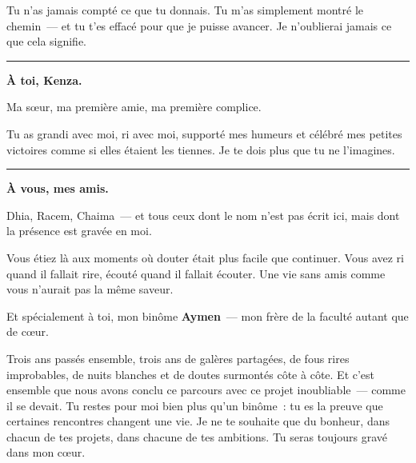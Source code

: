 \begin{center}
\begin{minipage}{0.75\textwidth}
\vspace{0.3cm}

Tu n'as jamais compté ce que tu donnais. Tu m'as simplement montré le chemin~---
et tu t'es effacé pour que je puisse avancer. Je n'oublierai jamais ce que cela signifie.
\end{minipage}

\vspace{1cm}
\rule{0.4\textwidth}{0.4pt}
\vspace{1cm}

{\large\bfseries À toi, Kenza.}

\vspace{0.4cm}

\begin{minipage}{0.75\textwidth}
\centering
Ma sœur, ma première amie, ma première complice.

\vspace{0.3cm}

Tu as grandi avec moi, ri avec moi, supporté mes humeurs et célébré mes petites victoires
comme si elles étaient les tiennes. Je te dois plus que tu ne l'imagines.
\end{minipage}

\vspace{1cm}
\rule{0.4\textwidth}{0.4pt}
\vspace{1cm}

{\large\bfseries À vous, mes amis.}

\vspace{0.4cm}

\begin{minipage}{0.75\textwidth}
\centering
Dhia, Racem, Chaima~--- et tous ceux dont le nom n'est pas écrit ici,
mais dont la présence est gravée en moi.

\vspace{0.3cm}

Vous étiez là aux moments où douter était plus facile que continuer.
Vous avez ri quand il fallait rire, écouté quand il fallait écouter.
Une vie sans amis comme vous n'aurait pas la même saveur.

\vspace{0.4cm}

Et spécialement à toi, mon binôme \textbf{Aymen}~--- mon frère de la faculté autant que de c\oe{}ur.

\vspace{0.3cm}

Trois ans passés ensemble, trois ans de galères partagées, de fous rires improbables,
de nuits blanches et de doutes surmontés côte à côte. Et c'est ensemble que nous avons
conclu ce parcours avec ce projet inoubliable~--- comme il se devait.
Tu restes pour moi bien plus qu'un binôme~: tu es la preuve que certaines rencontres
changent une vie. Je ne te souhaite que du bonheur, dans chacun de tes projets,
dans chacune de tes ambitions. Tu seras toujours gravé dans mon c\oe{}ur.


\end{minipage}
\end{center}
